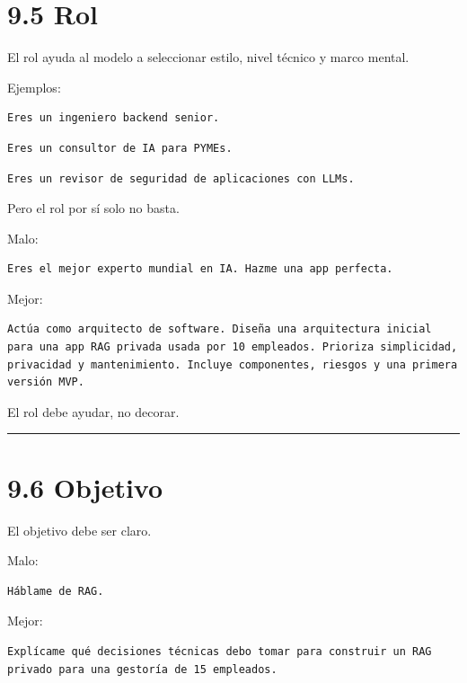 \section{9.5 Rol}\label{rol-1}

El rol ayuda al modelo a seleccionar estilo, nivel técnico y marco
mental.

Ejemplos:

\begin{lstlisting}
Eres un ingeniero backend senior.
\end{lstlisting}

\begin{lstlisting}
Eres un consultor de IA para PYMEs.
\end{lstlisting}

\begin{lstlisting}
Eres un revisor de seguridad de aplicaciones con LLMs.
\end{lstlisting}

Pero el rol por sí solo no basta.

Malo:

\begin{lstlisting}
Eres el mejor experto mundial en IA. Hazme una app perfecta.
\end{lstlisting}

Mejor:

\begin{lstlisting}
Actúa como arquitecto de software. Diseña una arquitectura inicial para una app RAG privada usada por 10 empleados. Prioriza simplicidad, privacidad y mantenimiento. Incluye componentes, riesgos y una primera versión MVP.
\end{lstlisting}

El rol debe ayudar, no decorar.

\begin{center}\rule{0.5\linewidth}{0.5pt}\end{center}

\section{9.6 Objetivo}\label{objetivo-1}

El objetivo debe ser claro.

Malo:

\begin{lstlisting}
Háblame de RAG.
\end{lstlisting}

Mejor:

\begin{lstlisting}
Explícame qué decisiones técnicas debo tomar para construir un RAG privado para una gestoría de 15 empleados.
\end{lstlisting}


